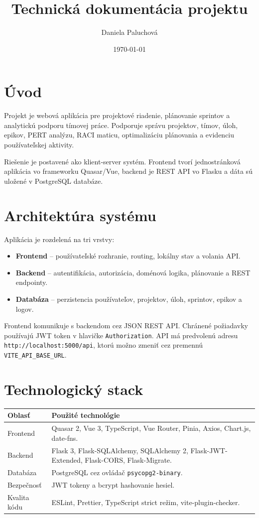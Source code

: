 ﻿\documentclass[12pt,a4paper]{article}
\title{Technická dokumentácia projektu}
\author{Daniela Paluchová}
\date{\today}
\begin{document}
\maketitle
\tableofcontents
\newpage

\section{Úvod}

Projekt je webová aplikácia pre projektové riadenie, plánovanie sprintov a analytickú podporu tímovej práce. Podporuje správu projektov, tímov, úloh, epikov, PERT analýzu, RACI maticu, optimalizáciu plánovania a evidenciu používateľskej aktivity.

Riešenie je postavené ako klient-server systém. Frontend tvorí jednostránková aplikácia vo frameworku Quasar/Vue, backend je REST API vo Flasku a dáta sú uložené v PostgreSQL databáze.

\section{Architektúra systému}

Aplikácia je rozdelená na tri vrstvy:

\begin{itemize}
  \item \textbf{Frontend} -- používateľské rozhranie, routing, lokálny stav a volania API.
  \item \textbf{Backend} -- autentifikácia, autorizácia, doménová logika, plánovanie a REST endpointy.
  \item \textbf{Databáza} -- perzistencia používateľov, projektov, úloh, sprintov, epikov a logov.
\end{itemize}

Frontend komunikuje s backendom cez JSON REST API. Chránené požiadavky používajú JWT token v hlavičke \texttt{Authorization}. API má predvolenú adresu \texttt{http://localhost:5000/api}, ktorú možno zmeniť cez premennú \texttt{VITE\_API\_BASE\_URL}.

\section{Technologický stack}

\begin{longtable}{|p{4cm}|p{9.5cm}|}
\hline
\textbf{Oblasť} & \textbf{Použité technológie} \\
\hline
Frontend & Quasar 2, Vue 3, TypeScript, Vue Router, Pinia, Axios, Chart.js, date-fns. \\
\hline
Backend & Flask 3, Flask-SQLAlchemy, SQLAlchemy 2, Flask-JWT-Extended, Flask-CORS, Flask-Migrate. \\
\hline
Databáza & PostgreSQL cez ovládač \texttt{psycopg2-binary}. \\
\hline
Bezpečnosť & JWT tokeny a bcrypt hashovanie hesiel. \\
\hline
Kvalita kódu & ESLint, Prettier, TypeScript strict režim, vite-plugin-checker. \\
\hline
\end{longtable}
\end{document}
